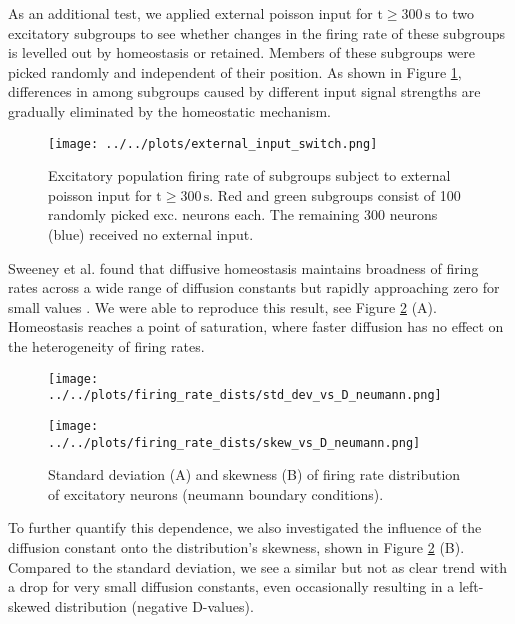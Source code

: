 \documentclass[10pt,a4paper]{article}
\begin{document}
As an additional test, we applied external poisson input for $\mathrm{t\geq 300\, s}$ to two excitatory subgroups to see whether changes in the firing rate of these subgroups is levelled out by homeostasis or retained. Members of these subgroups were picked randomly and independent of their position. As shown in Figure \ref{Ext_Input_Switch}, differences in among subgroups caused by different input signal strengths are gradually eliminated by the homeostatic mechanism.
\begin{figure}
\begin{center}
\texttt{[image: ../../plots/external\_input\_switch.png]}
\end{center}
\caption{Excitatory population firing rate of subgroups subject to external poisson input for $\mathrm{t\geq 300\, s}$. Red and green subgroups consist of 100 randomly picked exc. neurons each. The remaining 300 neurons (blue) received no external input.}
\label{Ext_Input_Switch}
\end{figure}

Sweeney et al. found that diffusive homeostasis maintains broadness of firing rates across a wide range of diffusion constants but rapidly approaching zero for small values \cite[p. 6]{Sweeney_Paper}. We were able to reproduce this result, see Figure \ref{Fir_Rate_Dist_Width_Skewness_vs_D} (A). Homeostasis reaches a point of saturation, where faster diffusion has no effect on the heterogeneity of firing rates. 
\begin{figure}
\begin{minipage}{0.5\textwidth}
\texttt{[image: ../../plots/firing\_rate\_dists/std\_dev\_vs\_D\_neumann.png]}
\end{minipage}
\begin{minipage}{0.5\textwidth}
\texttt{[image: ../../plots/firing\_rate\_dists/skew\_vs\_D\_neumann.png]}
\end{minipage}
\caption{Standard deviation (A) and skewness (B) of firing rate distribution of excitatory neurons (neumann boundary conditions).}
\label{Fir_Rate_Dist_Width_Skewness_vs_D}
\end{figure}
To further quantify this dependence, we also investigated the influence of the diffusion constant onto the distribution's skewness, shown in Figure \ref{Fir_Rate_Dist_Width_Skewness_vs_D} (B). Compared to the standard deviation, we see a similar but not as clear trend with a drop for very small diffusion constants, even occasionally resulting in a left-skewed distribution (negative D-values).
\end{document}
